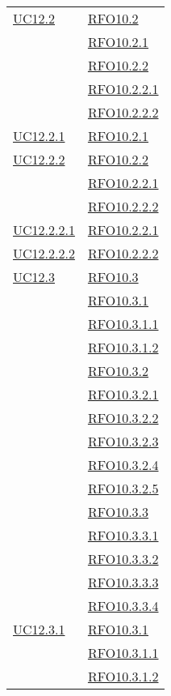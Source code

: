 \begin{longtable}{|>{\centering}m{5cm}|m{5cm}<{\centering}|}
\hyperlink{UC12.2}{UC12.2} 
& \hyperlink{RFO10.2}{RFO10.2}\\
& \hyperlink{RFO10.2.1}{RFO10.2.1}\\
& \hyperlink{RFO10.2.2}{RFO10.2.2}\\
& \hyperlink{RFO10.2.2.1}{RFO10.2.2.1}\\
& \hyperlink{RFO10.2.2.2}{RFO10.2.2.2}\\\hline

\hyperlink{UC12.2.1}{UC12.2.1} & \hyperlink{RFO10.2.1}{RFO10.2.1}\\\hline
\hyperlink{UC12.2.2}{UC12.2.2} 
& \hyperlink{RFO10.2.2}{RFO10.2.2}\\
& \hyperlink{RFO10.2.2.1}{RFO10.2.2.1}\\
& \hyperlink{RFO10.2.2.2}{RFO10.2.2.2}\\\hline

\hyperlink{UC12.2.2.1}{UC12.2.2.1} & \hyperlink{RFO10.2.2.1}{RFO10.2.2.1}\\\hline
\hyperlink{UC12.2.2.2}{UC12.2.2.2} & \hyperlink{RFO10.2.2.2}{RFO10.2.2.2}\\\hline

\hyperlink{UC12.3}{UC12.3}
& \hyperlink{RFO10.3}{RFO10.3}\\
& \hyperlink{RFO10.3.1}{RFO10.3.1}\\
& \hyperlink{RFO10.3.1.1}{RFO10.3.1.1}\\
& \hyperlink{RFO10.3.1.2}{RFO10.3.1.2}\\
& \hyperlink{RFO10.3.2}{RFO10.3.2}\\
& \hyperlink{RFO10.3.2.1}{RFO10.3.2.1}\\
& \hyperlink{RFO10.3.2.2}{RFO10.3.2.2}\\
& \hyperlink{RFO10.3.2.3}{RFO10.3.2.3}\\
& \hyperlink{RFO10.3.2.4}{RFO10.3.2.4}\\
& \hyperlink{RFO10.3.2.5}{RFO10.3.2.5}\\
& \hyperlink{RFO10.3.3}{RFO10.3.3}\\
& \hyperlink{RFO10.3.3.1}{RFO10.3.3.1}\\
& \hyperlink{RFO10.3.3.2}{RFO10.3.3.2}\\
& \hyperlink{RFO10.3.3.3}{RFO10.3.3.3}\\
& \hyperlink{RFO10.3.3.4}{RFO10.3.3.4}\\\hline

\hyperlink{UC12.3.1}{UC12.3.1}
& \hyperlink{RFO10.3.1}{RFO10.3.1}\\
& \hyperlink{RFO10.3.1.1}{RFO10.3.1.1}\\
& \hyperlink{RFO10.3.1.2}{RFO10.3.1.2}\\\hline


\end{longtable}
